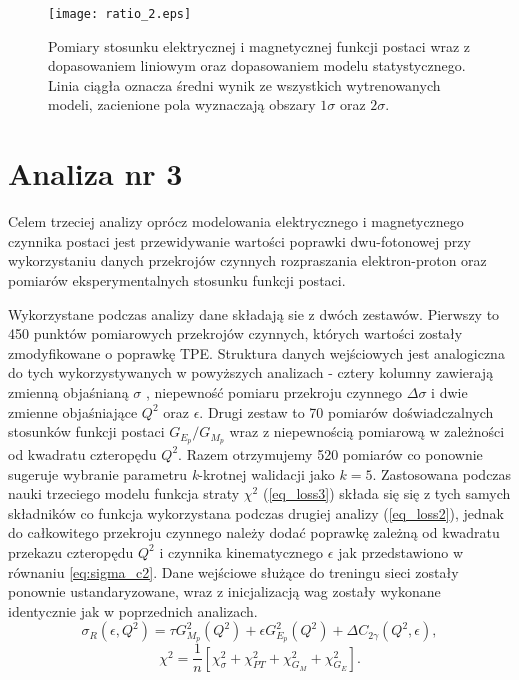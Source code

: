 \documentclass[11pt]{book}
\theoremstyle{definition}
\begin{document}
%
\begin{figure}[hp!]
	\centering
	\texttt{[image: ratio\_2.eps]}
	\caption{Pomiary stosunku elektrycznej i magnetycznej funkcji postaci wraz z dopasowaniem liniowym oraz dopasowaniem modelu statystycznego. Linia ciągła oznacza średni wynik ze wszystkich wytrenowanych modeli, zacienione pola wyznaczają obszary $1 \sigma$ oraz $2\sigma$.} 
	\label{fig:ratio2}
\end{figure}

\newpage

\section{Analiza nr 3}

Celem trzeciej analizy oprócz modelowania elektrycznego i magnetycznego czynnika postaci jest przewidywanie wartości poprawki dwu-fotonowej przy wykorzystaniu danych przekrojów czynnych rozpraszania elektron-proton oraz pomiarów eksperymentalnych stosunku funkcji postaci.

%
Wykorzystane podczas analizy dane składają sie z dwóch zestawów. Pierwszy to 450 punktów pomiarowych przekrojów czynnych, których wartości zostały zmodyfikowane o poprawkę TPE. Struktura danych wejściowych jest analogiczna do tych wykorzystywanych w powyższych analizach - cztery kolumny zawierają zmienną objaśnianą $\sigma$ , niepewność pomiaru przekroju czynnego $\Delta \sigma$ i dwie zmienne objaśniające $Q^2$ oraz $\epsilon$. Drugi zestaw to 70 pomiarów doświadczalnych stosunków funkcji postaci $G_{E_p} / G_{M_p}$ wraz z niepewnością pomiarową w zależności od kwadratu czteropędu $Q^2$. Razem otrzymujemy 520 pomiarów co ponownie sugeruje wybranie parametru \textit{k}-krotnej walidacji jako $k=5$. Zastosowana podczas nauki trzeciego modelu funkcja straty $\chi^2$ (\ref{eq_loss3}) składa się się z tych samych składników co funkcja wykorzystana podczas drugiej analizy (\ref{eq_loss2}), jednak do całkowitego przekroju czynnego należy dodać poprawkę zależną od kwadratu przekazu czteropędu $Q^2$ i czynnika kinematycznego $\epsilon$ jak przedstawiono w równaniu \ref{eq:sigma_c2}. Dane wejściowe służące do treningu sieci zostały ponownie ustandaryzowane, wraz z inicjalizacją wag zostały wykonane identycznie jak w poprzednich analizach.
%
\begin{equation}
\sigma_R(\epsilon, Q^2) =\tau G_{M_p}^2(Q^2) + \epsilon G_{E_p}^2(Q^2) + \Delta C_{2 \gamma} \left(Q^2, \epsilon \right), \label{eq:sigma_c2}
\end{equation}
%
\begin{equation}
\chi^2 = \frac{1}{n} \left[ \chi_{\sigma}^2 + \chi_{PT}^2 + \chi_{G_M}^2  + \chi_{G_E}^2  \right]. \label{eq_loss3}
\end{equation}
\end{document}
